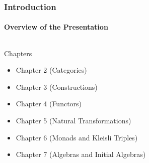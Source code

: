 \documentclass{beamer}
\begin{document}

\begin{frame}[label={overview-presentation}]
  \frametitle{Introduction}
  \framesubtitle{Overview of the Presentation}

  \begin{columns}[onlytextwidth,c]
    \begin{column}{.8\textwidth}
      \begin{block}{Chapters}
        \begin{itemize}
        \item \alert{Chapter 2 (Categories)}
        \item Chapter 3 (Constructions)
        \item \alert{Chapter 4 (Functors)}
        \item \alert{Chapter 5 (Natural Transformations)}
        \item Chapter 6 (Monads and Kleisli Triples)
        \item Chapter 7 (Algebras and Initial Algebras)
        \end{itemize}
      \end{block}
    \end{column}
    \begin{column}{.2\textwidth}
      \begin{center}
      \end{center}
    \end{column}
  \end{columns}

\end{frame}

\end{document}
